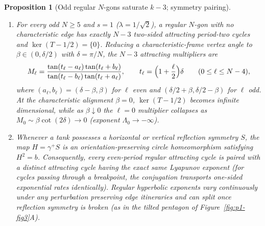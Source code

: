 \documentclass[11pt,reqno]{amsart}
\newtheorem{proposition}[theorem]{Proposition}
\theoremstyle{definition}
\theoremstyle{remark}
\begin{document}
\begin{proposition}[Odd regular $N$-gons saturate $k-3$; symmetry pairing]\label{prop:odd-regular}
\leavevmode
\begin{enumerate}
  \item For every odd $N \ge 5$ and $s = 1$ ($\lambda = 1/\sqrt{2}$), a regular $N$-gon with no characteristic edge has \emph{exactly} $N - 3$ two-sided attracting period-two cycles and $\ker(T - 1/2) = \{0\}$. Reducing a characteristic-frame vertex angle to $\beta \in (0, \delta/2)$ with $\delta = \pi/N$, the $N - 3$ attracting multipliers are
  \begin{equation}\label{eq:odd-N-mult}
    M_\ell = \frac{\tan(t_\ell - a_\ell)\tan(t_\ell + b_\ell)}{\tan(t_\ell - b_\ell)\tan(t_\ell + a_\ell)}, \qquad t_\ell = \Bigl(1 + \frac{\ell}{2}\Bigr)\delta \qquad (0 \le \ell \le N-4),
  \end{equation}
  where $(a_\ell, b_\ell) = (\delta-\beta, \beta)$ for $\ell$ even and $(\delta/2+\beta, \delta/2-\beta)$ for $\ell$ odd. At the characteristic alignment $\beta = 0$, $\ker(T - 1/2)$ becomes infinite dimensional, while as $\beta \downarrow 0$ the $\ell = 0$ multiplier collapses as $M_0 \sim \beta\cot(2\delta) \to 0$ (exponent $\Lambda_0 \to -\infty$).
  \item Whenever a tank possesses a horizontal or vertical reflection symmetry $S$, the map $H = \gamma^+ S$ is an orientation-preserving circle homeomorphism satisfying $H^2 = b$. Consequently, every even-period regular attracting cycle is paired with a distinct attracting cycle having the \emph{exact same} Lyapunov exponent (for cycles passing through a breakpoint, the conjugation transports one-sided exponential rates identically). Regular hyperbolic exponents vary continuously under any perturbation preserving edge itineraries and can split once reflection symmetry is broken (as in the tilted pentagon of Figure~\ref{fig:p1-fig3}A).
\end{enumerate}
\end{proposition}
\end{document}
